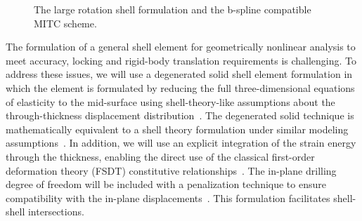 \documentclass[]{aiaa-tc}
\begin{document}
\begin{figure}[h]
  \centering
  \caption{The large rotation shell formulation and the b-spline
    compatible MITC scheme.}
  \label{fig:shell-figs}
\end{figure}

The formulation of a general shell element for geometrically nonlinear
analysis to meet accuracy, locking and rigid-body translation
requirements is challenging. To address these issues, we will use a
degenerated solid shell element formulation in which the element is
formulated by reducing the full three-dimensional equations of
elasticity to the mid-surface using shell-theory-like assumptions
about the through-thickness displacement
distribution~\cite{Ahmad:1970:ATS, Bathe:1980:GMN, Parisch:1978:GNA,
  Hughes:1981:NFE}.  The degenerated solid technique is mathematically
equivalent to a shell theory formulation under similar modeling
assumptions~\cite{Buechter:1992:STD}. In addition, we will use an
explicit integration of the strain energy through the thickness,
enabling the direct use of the classical first-order deformation
theory (FSDT) constitutive relationships~\cite{Milford:1986:DIF,
  Buechter:1992:STD}. The in-plane drilling degree of freedom will be
included with a penalization technique to ensure compatibility with
the in-plane displacements~\cite{Hughes:1989:DDF, Simo:1992:FFE,
  Fox:1992:DRF}. This formulation facilitates shell-shell
intersections.
\end{document}

